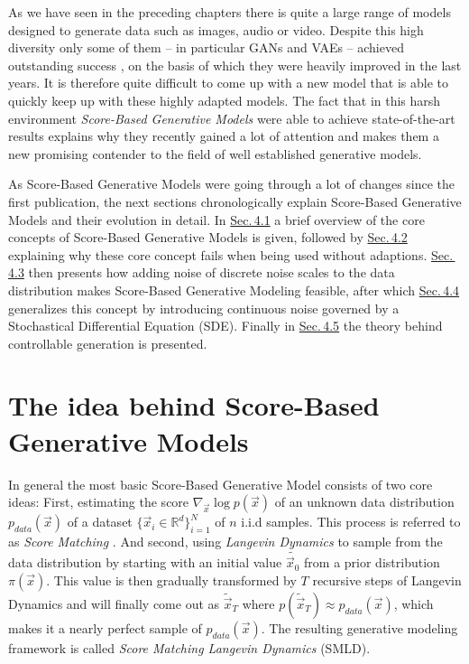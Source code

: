As we have seen in the preceding chapters there is quite a large range of models designed to generate data such as images, audio or video. Despite this high diversity only some of them – in particular GANs and VAEs – achieved outstanding success \cite{biggan, vqvae2}, on the basis of which they were heavily improved in the last years. It is therefore quite difficult to come up with a new model that is able to quickly keep up with these highly adapted models. The fact that in this harsh environment \textit{Score-Based Generative Models} \cite{score_1, score_3, score_2} were able to achieve state-of-the-art results explains why they recently gained a lot of attention and makes them a new promising contender to the field of well established generative models.

As Score-Based Generative Models were going through a lot of changes since the first publication, the next sections chronologically explain Score-Based Generative Models and their evolution in detail. In \hyperref[sec:4.1]{Sec.\,4.1} a brief overview of the core concepts of Score-Based Generative Models is given, followed by \hyperref[sec:4.2]{Sec.\,4.2} explaining why these core concept fails when being used without adaptions. \hyperref[sec:4.3]{Sec.\,4.3} then presents how adding noise of discrete noise scales to the data distribution makes Score-Based Generative Modeling feasible, after which \hyperref[sec:4.4]{Sec.\,4.4} generalizes this concept by introducing continuous noise governed by a Stochastical Differential Equation (SDE). Finally in \hyperref[sec:4.5]{Sec.\,4.5} the theory behind controllable generation is presented.

\section{The idea behind Score-Based Generative Models} \label{sec:4.1}
In general the most basic Score-Based Generative Model consists of two core ideas: First, estimating the score $\nabla_{\vec{x}}\log p(\vec{x})$ of an unknown data distribution $p_{data}(\vec{x})$ of a dataset $\{\vec{x}_i\in \mathbb{R}^d\}_{i=1}^N$ of $n$ i.i.d samples. This process is referred to as \textit{Score Matching} \cite{score_matching_original}. And second, using \textit{Langevin Dynamics} \cite{langevin1, langevin2} to sample from the data distribution by starting with an initial value $\tilde{\vec{x}_0}$ from a prior distribution $\pi(\vec{x})$. This value is then gradually transformed by $T$ recursive steps of Langevin Dynamics and will finally come out as $\tilde{\vec{x}}_T$ where $p(\tilde{\vec{x}}_T)\approx p_{data}(\vec{x})$, which makes it a nearly perfect sample of $p_{data}(\vec{x})$. The resulting generative modeling framework is called \textit{Score Matching Langevin Dynamics} (SMLD).
%
